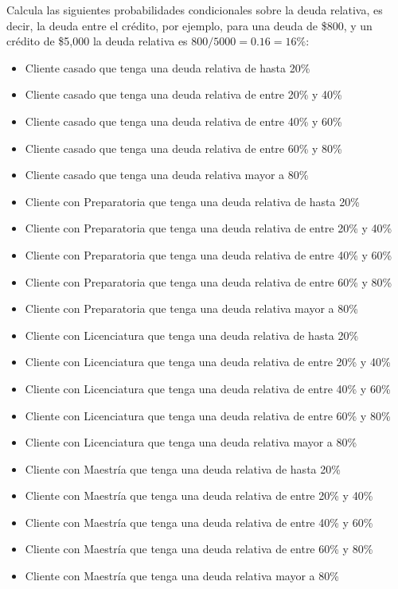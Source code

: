 \documentclass{article}
\begin{document}
Calcula las siguientes probabilidades condicionales sobre la deuda relativa, es decir, la deuda entre el crédito, por ejemplo, para una deuda de \$800, y un crédito de \$5,000 la deuda relativa es $800/5000 = 0.16 = 16\%$:
\begin{itemize}
    \item Cliente casado que tenga una deuda relativa de hasta 20\%
    \item Cliente casado que tenga una deuda relativa de entre 20\% y 40\%
    \item Cliente casado que tenga una deuda relativa de entre 40\% y 60\%
    \item Cliente casado que tenga una deuda relativa de entre 60\% y 80\%
    \item Cliente casado que tenga una deuda relativa mayor a 80\%
    \item Cliente con Preparatoria que tenga una deuda relativa de hasta 20\%
    \item Cliente con Preparatoria que tenga una deuda relativa de entre 20\% y 40\%
    \item Cliente con Preparatoria que tenga una deuda relativa de entre 40\% y 60\%
    \item Cliente con Preparatoria que tenga una deuda relativa de entre 60\% y 80\%
    \item Cliente con Preparatoria que tenga una deuda relativa mayor a 80\%
    \item Cliente con Licenciatura que tenga una deuda relativa de hasta 20\%
    \item Cliente con Licenciatura que tenga una deuda relativa de entre 20\% y 40\%
    \item Cliente con Licenciatura que tenga una deuda relativa de entre 40\% y 60\%
    \item Cliente con Licenciatura que tenga una deuda relativa de entre 60\% y 80\%
    \item Cliente con Licenciatura que tenga una deuda relativa mayor a 80\%
    \item Cliente con Maestría que tenga una deuda relativa de hasta 20\%
    \item Cliente con Maestría que tenga una deuda relativa de entre 20\% y 40\%
    \item Cliente con Maestría que tenga una deuda relativa de entre 40\% y 60\%
    \item Cliente con Maestría que tenga una deuda relativa de entre 60\% y 80\%
    \item Cliente con Maestría que tenga una deuda relativa mayor a 80\%
\end{itemize}
\end{document}
